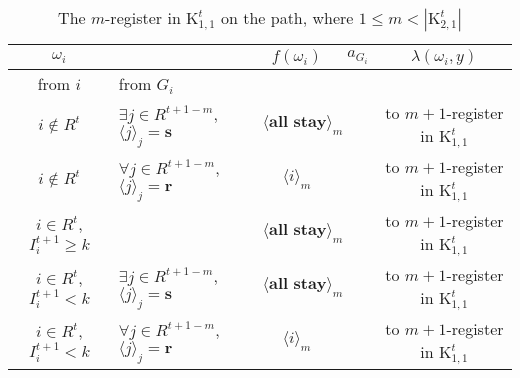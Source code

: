 \documentclass[12pt,letter]{article}
\newcommand{\Kappa}{\mathrm{K}}
\newcommand{\Omicron}{\mathrm{O}}
\theoremstyle{definition}
\theoremstyle{remark}
\theoremstyle{claim}
\begin{document}
\begin{table}[!htbp]
\caption{The $m$-register in $\Kappa^t_{1,1}$ on the path, where $1\leq m<|\Kappa^t_{2,1}|$}
\begin{center}
\begin{tabular}{c l | c | c | c}
$\omega_i$ 	 & 	   &	$f(\omega_i)$  &	$a_{G_i}$ & $\lambda(\omega_i,y)$ \\
\hline
\hline
from $i$ 	 & from $G_i$	  & 	&	 & \\
\hline
$i\notin R^t$  	& 	$\exists j\in R^{t+1-m}$, $\langle j \rangle_j=\textbf{s}$	& $\langle \textbf{all stay} \rangle_m$		&  	& to $m+1$-register in $\Kappa^t_{1,1}$\\
$i\notin R^t$  	& 	$\forall j\in R^{t+1-m}$, $\langle j \rangle_j=\textbf{r}$	& $\langle i \rangle_m$		&  	& to $m+1$-register in $\Kappa^t_{1,1}$\\
$i\in R^t$, $I^{t+1}_i\geq k$	 & 				& $\langle \textbf{all stay} \rangle_m$ 	& 		& to $m+1$-register in $\Kappa^t_{1,1}$\\
$i\in R^t$, $I^{t+1}_i< k$	 &  $\exists j\in R^{t+1-m}$, $\langle j \rangle_j=\textbf{s}$ 	& $\langle \textbf{all stay} \rangle_m$ 	& 	 & to $m+1$-register in $\Kappa^t_{1,1}$\\
$i\in R^t$, $I^{t+1}_i< k$	 &  $\forall j\in R^{t+1-m}$, $\langle j \rangle_j=\textbf{r}$ 	& $\langle i \rangle_m$ 	& 	 & to $m+1$-register in $\Kappa^t_{1,1}$\\
\hline
\end{tabular}
\end{center}
\end{table}



\clearpage
\end{document}
